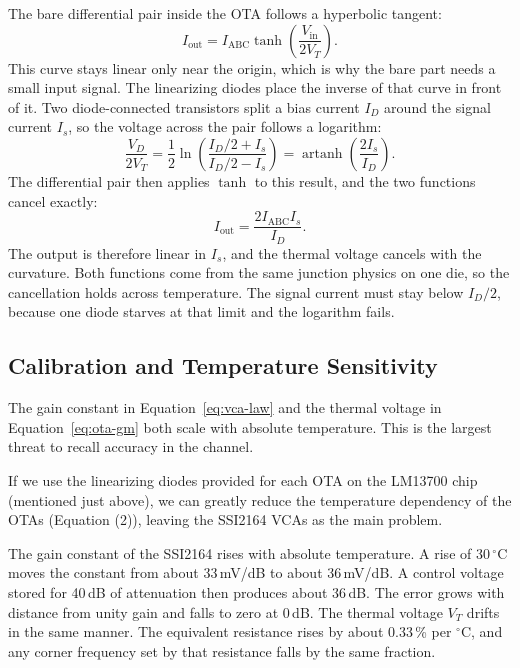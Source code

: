 \documentclass[11pt, letterpaper,titlepage]{article}
\begin{document}
The bare differential pair inside the OTA follows a hyperbolic tangent:
%
\begin{equation}
    I_\mathrm{out} = I_\mathrm{ABC} \tanh\!\left( \frac{V_\mathrm{in}}{2 V_T} \right) .
    \label{eq:ota-tanh}
\end{equation}
%
This curve stays linear only near the origin, which is why the bare part needs a
small input signal. The linearizing diodes place the inverse of that curve in
front of it. Two diode-connected transistors split a bias current $I_D$ around
the signal current $I_s$, so the voltage across the pair follows a logarithm:
%
\begin{equation}
    \frac{V_D}{2 V_T}
    = \frac{1}{2} \ln\!\left( \frac{I_D/2 + I_s}{I_D/2 - I_s} \right)
    = \operatorname{artanh}\!\left( \frac{2 I_s}{I_D} \right) .
    \label{eq:ota-diode}
\end{equation}
%
The differential pair then applies $\tanh$ to this result, and the two functions
cancel exactly:
%
\begin{equation}
    I_\mathrm{out} = \frac{2 I_\mathrm{ABC} I_s}{I_D} .
    \label{eq:ota-linear}
\end{equation}
%
The output is therefore linear in $I_s$, and the thermal voltage cancels with
the curvature. Both functions come from the same junction physics on one die, so
the cancellation holds across temperature. The signal current must stay below
$I_D/2$, because one diode starves at that limit and the logarithm fails.





\subsection{Calibration and Temperature Sensitivity}
\label{sssec:temperature}

The gain constant in Equation~\eqref{eq:vca-law} and the thermal voltage in
Equation~\eqref{eq:ota-gm} both scale with absolute temperature. This is the
largest threat to recall accuracy in the channel.

If we use the linearizing diodes provided for each OTA on the LM13700 chip (mentioned just above), we can greatly reduce the temperature dependency of the OTAs (Equation (2)), leaving the SSI2164 VCAs as the main problem.

The gain constant of the SSI2164 rises with absolute temperature. A rise of
30\,$^\circ$C moves the constant from about 33\,mV/dB to about 36\,mV/dB. A
control voltage stored for 40\,dB of attenuation then produces about 36\,dB.
The error grows with distance from unity gain and falls to zero at 0\,dB. The
thermal voltage $V_T$ drifts in the same manner. The equivalent resistance
rises by about 0.33\,\% per $^\circ$C, and any corner frequency set by that
resistance falls by the same fraction.
\end{document}
